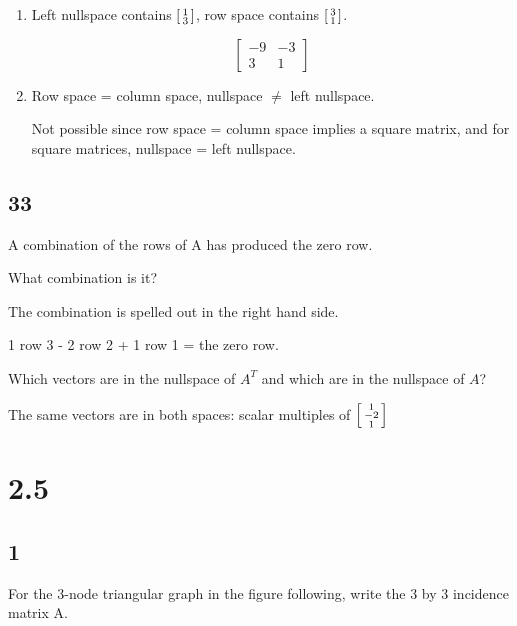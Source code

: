 \documentclass[12pt,letterpaper]{article}
\begin{document}
\begin{enumerate}
        \item
          Left nullspace contains $\begin{bsmallmatrix}1 \\ 3\end{bsmallmatrix}$, row space contains $\begin{bsmallmatrix}3 \\ 1\end{bsmallmatrix}$.

          \[
            \begin{bmatrix}
              -9 & -3 \\
              3 & 1
            \end{bmatrix}
          \]

        \item
          Row space = column space, nullspace $\ne$ left nullspace.

          Not possible since row space = column space implies a square matrix, and for square matrices, nullspace = left nullspace.
      \end{enumerate}
    \subsection*{33}
      A combination of the rows of A has produced the zero row.

      What combination is it?

      The combination is spelled out in the right hand side.

      1 row 3 - 2 row 2 + 1 row 1 = the zero row.

      Which vectors are in the nullspace of $A^T$ and which are in the nullspace of $A$?

      The same vectors are in both spaces: scalar multiples of $\begin{bsmallmatrix}1 \\ -2 \\ 1\end{bsmallmatrix}$

  \section*{2.5}
    \subsection*{1}
      For the 3-node triangular graph in the figure following, write the 3 by 3 incidence matrix A.
\end{document}
